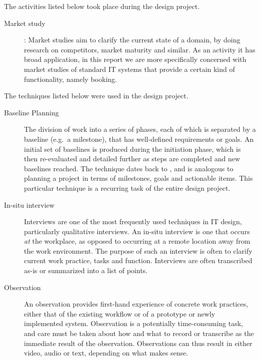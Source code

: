 The activities listed below took place during the design project.
\begin{description}
    \item [Market study]: Market studies aim to clarify the current state of a
        domain, by doing research on competitors, market maturity and similar.
        As an activity it has broad application, in this report we are more
        specifically concerned with market studies of standard IT systems that
        provide a certain kind of functionality, namely booking.
\end{description}

The techniques listed below were used in the design project.
\begin{description}
    \item [Baseline Planning] The division of work into a series of phases,
        each of which is separated by a baseline (e.g.\ a milestone), that has well-defined
        requirements or goals. An initial set of baselines is produced during the initiation
        phase, which is then re-evaluated and detailed further as steps are completed and new
        baselines reached. The technique dates back to \cite{andersen1990professional}, and is
        analogous to planning a project in terms of milestones, goals and actionable items. This
        particular technique is a recurring task of the entire design project.

    \item [In-situ interview] Interviews are one of the most frequently used techniques in IT 
        design, particularly qualitative interviews\cite{bodker2004participatory}. An in-situ
        interview is one that occurs \textit{at} the workplace, as opposed to occurring at a
        remote location away from the work environment. The purpose of such an interview is often
        to clarify current work practice, tasks and function. Interviews are often transcribed as-is
        or summarized into a list of points.

    \item [Observation] An observation provides first-hand experience of
        concrete work practices, either that of the existing workflow or of a
        prototype or newly implemented system. Observation is a potentially
        time-consuming task, and care must be taken about how and what to record
        or transcribe as the immediate result of the observation. Observations
        can thus result in either video, audio or text, depending on what makes
        sense.


\end{description}

